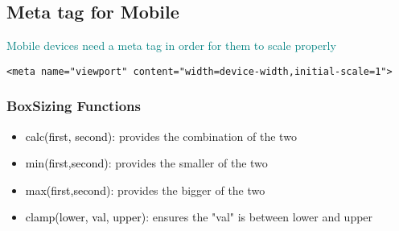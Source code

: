 \documentclass[main.tex,fontsize=8pt,paper=a4,paper=portrait,DIV=calc,]{scrartcl}
\begin{document}
\subsection{Meta tag for Mobile}
\textcolor{teal}{Mobile devices need a meta tag in order for them to scale properly}
\begin{lstlisting}
<meta name="viewport" content="width=device-width,initial-scale=1">
\end{lstlisting}

\subsubsection{BoxSizing Functions}
\begin{itemize}
\item \textcolor{black}{calc(first, second)}: provides the combination of the two
\item \textcolor{black}{min(first,second)}: provides the smaller of the two
\item \textcolor{black}{max(first,second)}: provides the bigger of the two
\item \textcolor{black}{clamp(lower, val, upper)}: ensures the "val" is between lower and upper 
\end{itemize} 


\lstset{
    language=CSS,
    style=code,
}

\lstset{
    language=HTML,
    style=code,
}
\end{document}
